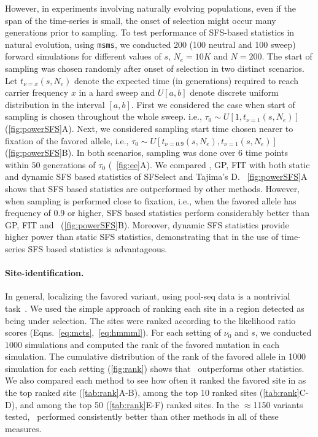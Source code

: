 However, in experiments involving naturally evolving populations,
even if the span of the time-series is small, the onset of selection
might occur many generations prior to sampling. To test performance of
SFS-based statistics in natural evolution, using \texttt{msms}, we conducted 
200 (100
neutral and 100 sweep) forward simulations for different values of
$s$, $N_e=10K$ and $N=200$. The start
of sampling was chosen randomly after onset of selection in two distinct 
scenarios. Let $t_{\nu=x}(s,N_e)$ denote
the expected time (in generations) required to reach carrier frequency
$x$ in a hard sweep and $U[a,b]$ denote discrete uniform distribution
in the interval $[a,b]$. First we considered the case when start of
sampling is chosen throughout the whole sweep. i.e., $\tau_0 \sim
U\left[1,t_{\nu=1}(s,N_e)\right]$ (\ref{fig:powerSFS}A). Next, we
considered sampling start time chosen nearer to fixation of the
favored allele, i.e., $\tau_0 \sim
U\left[t_{\nu=0.9}(s,N_e),t_{\nu=1}(s,N_e)\right]$
(\ref{fig:powerSFS}B). In both scenarios, sampling was done over
$6$ time points within $50$ generations of $\tau_0$ (~\ref{fig:ee}A). We 
compared
\comale, GP, FIT with both static and dynamic SFS based statistics of
SFSelect and Tajima's D. ~\ref{fig:powerSFS}A shows that SFS based
statistics are outperformed by other methods. However,
when sampling is performed close to fixation, i.e., when the favored
allele has frequency of 0.9 or higher, SFS based statistics perform
considerably better than GP, FIT and \comale\
(\ref{fig:powerSFS}B). Moreover, dynamic SFS statistics
provide higher power than static SFS statistics, demonstrating that in the use 
of time-series SFS based statistics is advantageous.


\paragraph{Site-identification.}
In general, localizing the favored variant, using pool-seq data is a nontrivial 
task~\cite{tobler2014massive}. We used the simple
approach of ranking each site in a region detected as being under
selection. The sites were ranked according to the likelihood ratio
scores (Eqns.~\ref{eq:mcts},~\ref{eq:hmmml}). For each setting of
$\nu_0$ and $s$, we conducted $1000$ simulations and computed the rank
of the favored mutation in each simulation. The cumulative
distribution of the rank of the favored allele in 1000 simulation for
each setting (\ref{fig:rank}) shows that \comale\ outperforms
other statistics. We also compared each method to see how often it
ranked the favored site in as the top ranked site
(\ref{tab:rank}A-B), among the top 10 ranked sites
(\ref{tab:rank}C-D), and among the top 50
(\ref{tab:rank}E-F) ranked sites. In the $\approx$1150 variants tested,
\comale\ performed consistently better than other methods in all of
these measures.

